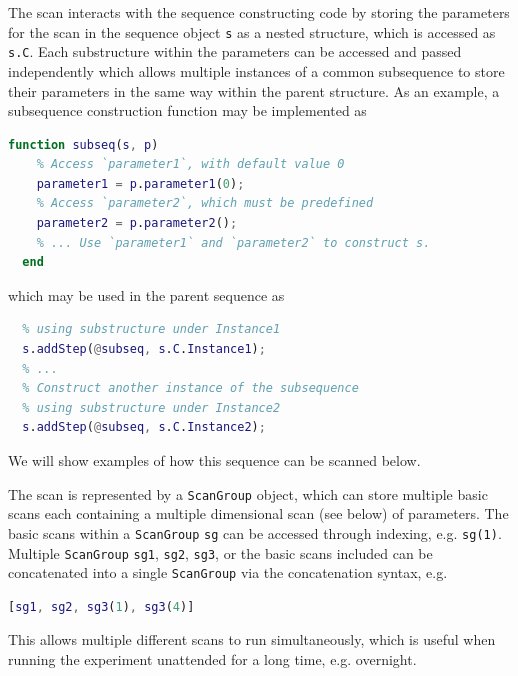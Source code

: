 The scan interacts with the sequence constructing code
by storing the parameters for the scan in the sequence object \lstinline{s} as a nested structure,
which is accessed as \lstinline{s.C}.
Each substructure within the parameters can be accessed and passed independently
which allows multiple instances of a common subsequence
to store their parameters in the same way within the parent structure.
As an example, a subsequence construction function may be implemented as
\begin{lstlisting}[language=Matlab]
  function subseq(s, p)
    % Access `parameter1`, with default value 0
    parameter1 = p.parameter1(0);
    % Access `parameter2`, which must be predefined
    parameter2 = p.parameter2();
    % ... Use `parameter1` and `parameter2` to construct s.
  end
\end{lstlisting}
which may be used in the parent sequence as
\begin{lstlisting}[language=Matlab]
  % Construct one instance of the subsequence
  % using substructure under Instance1
  s.addStep(@subseq, s.C.Instance1);
  % ...
  % Construct another instance of the subsequence
  % using substructure under Instance2
  s.addStep(@subseq, s.C.Instance2);
\end{lstlisting}
We will show examples of how this sequence can be scanned below.

The scan is represented by a \lstinline{ScanGroup} object,
which can store multiple basic scans each containing
a multiple dimensional scan (see below) of parameters.
The basic scans within a \lstinline{ScanGroup} \lstinline{sg} can be accessed through
indexing, e.g. \lstinline{sg(1)}.
Multiple \lstinline{ScanGroup} \lstinline{sg1}, \lstinline{sg2}, \lstinline{sg3},
or the basic scans included can be concatenated into a single \lstinline{ScanGroup}
via the concatenation syntax, e.g.
\begin{lstlisting}[language=Matlab]
  [sg1, sg2, sg3(1), sg3(4)]
\end{lstlisting}
This allows multiple different scans to run simultaneously,
which is useful when running the experiment unattended for a long time, e.g. overnight.

